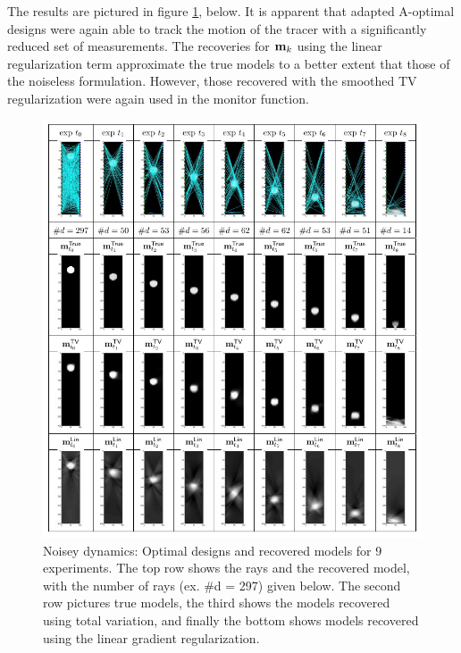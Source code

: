 \documentclass[11pt]{article}
\begin{document}
The results are pictured in figure \ref{fig:results2}, below. It is apparent that adapted A-optimal designs were again able to track the motion of the tracer with a significantly reduced set of measurements. The recoveries for ${\bf{m}}_k$ using the linear regularization term approximate the true models to a better extent that those of the noiseless formulation. However, those recovered with the smoothed TV regularization were again used in the monitor function. 
\begin{figure}
	\begin{center}
	\iwidth=160mm
	\includegraphics[width = 1\iwidth]{figures/newFigs/resultsAll2-new}
	\end{center}
	\caption{Noisey dynamics: Optimal designs and recovered models for 9 experiments. The top row shows the rays and the recovered model, with the number of rays (ex. \#d = 297) given below. The second row pictures true models, the third shows the  models recovered using total variation, and finally the bottom shows models recovered using the linear gradient regularization.}
	\label{fig:results2}
\end{figure}
%
\end{document}
